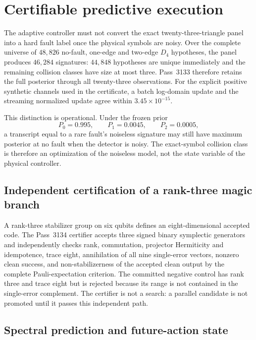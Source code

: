 \section{Certifiable predictive execution}\label{sec:bt3133-certifiable-predictive}

The adaptive controller must not convert the exact twenty-three-triangle panel into a hard
fault label once the physical symbols are noisy.  Over the complete universe of
$48{,}826$ no-fault, one-edge and two-edge $D_4$ hypotheses, the panel produces $46{,}284$
signatures: $44{,}848$ hypotheses are unique immediately and the remaining collision
classes have size at most three.  Pass~3133 therefore retains the full posterior through
all twenty-three observations.  For the explicit positive synthetic channels used in the
certificate, a batch log-domain update and the streaming normalized update agree within
$3.45\times10^{-15}$.

This distinction is operational.  Under the frozen prior
\[
 P_0=0.995,\qquad P_1=0.0045,\qquad P_2=0.0005,
\]
a transcript equal to a rare fault's noiseless signature may still have maximum posterior
at no fault when the detector is noisy.  The exact-symbol collision class is therefore an
optimization of the noiseless model, not the state variable of the physical controller.

\subsection{Independent certification of a rank-three magic branch}

A rank-three stabilizer group on six qubits defines an eight-dimensional accepted code.
The Pass~3134 certifier accepts three signed binary symplectic generators and independently
checks rank, commutation, projector Hermiticity and idempotence, trace eight, annihilation
of all nine single-error vectors, nonzero clean success, and non-stabilizerness of the
accepted clean output by the complete Pauli-expectation criterion.  The committed negative
control has rank three and trace eight but is rejected because its range is not contained
in the single-error complement.  The certifier is not a search: a parallel candidate is
not promoted until it passes this independent path.

\subsection{Spectral prediction and future-action state}

